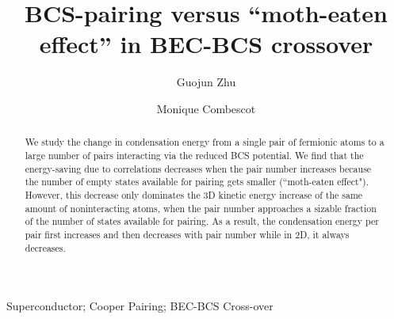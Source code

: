 \documentclass[5p,twocolumn]{elsarticle}
\begin{document}
\title{ BCS-pairing versus ``moth-eaten effect'' in BEC-BCS crossover}
\author[uiuc]{Guojun Zhu}
\author[uiuc,upmc]{Monique Combescot}
\address[uiuc]{Department of Physics, University of Illinois at Urbana-Champaign, 1110 W Green St, Urbana, IL, 61801}

\address[upmc]{Institut des NanoSciences de Paris, Universite Pierre et Marie Curie, CNRS, Tour 22, 4 place Jussieu, 75005 Paris }
\newcommand{\vk}{\ensuremath{\mathbf{k}}}
\providecommand{\vr}{\ensuremath{\mathbf{r}}}
\newcommand{\vp}{\ensuremath{\mathbf{p}}}


\providecommand{\comm}[1]{\textit{\scriptsize \uwave{(#1)}}}
\newcommand{\td}{{\ensuremath{{\text{(2D)}}}}}
\newcommand{\sd}{{\ensuremath{{\text{(3D)}}}}}
\newcommand{\Arctg}{\ensuremath{\text{Arctg}}}



\begin{abstract}
We study the change in condensation energy from a single pair of fermionic atoms to a large number of pairs interacting via the reduced BCS potential. We find that the energy-saving due to correlations decreases when the pair number increases because the number of empty states available for pairing gets smaller (``moth-eaten effect"). However, this decrease only dominates the 3D kinetic energy increase of the same amount of noninteracting atoms, when the pair number approaches a sizable fraction of the number of states available for pairing. As a result, the condensation energy per pair first increases and then decreases with pair number while in 2D, it always decreases.  
\end{abstract}
\begin{keyword}
Superconductor; Cooper Pairing; BEC-BCS Cross-over
\end{keyword}

\maketitle
\end{document}
